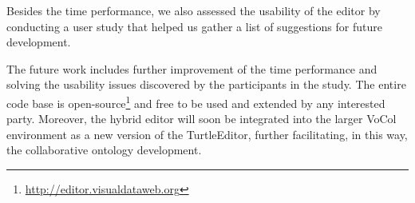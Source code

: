 Besides the time performance, we also assessed the usability of the editor by conducting a user study that helped us gather a list of suggestions for future development.

\null

The future work includes further improvement of the time performance and solving the usability issues discovered by the participants in the study. The entire code base is open-source\footnote{\url{http://editor.visualdataweb.org}} and free to be used and extended by any interested party. Moreover, the hybrid editor will soon be integrated into the larger VoCol environment as a new version of the TurtleEditor, further facilitating, in this way, the collaborative ontology development.
